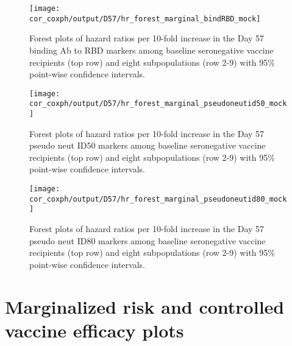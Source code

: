 \documentclass[]{book}
\theoremstyle{definition}
\theoremstyle{definition}
\theoremstyle{definition}
\newcommand{\1}{\mathbbm{1}}
\begin{document}
\begin{figure}[H]
    \centering
    \texttt{[image: cor\_coxph/output/D57/hr\_forest\_marginal\_bindRBD\_mock]}
    \caption{Forest plots of hazard ratios per 10-fold increase in the  Day 57 binding Ab to RBD markers among baseline seronegative vaccine recipients (top row) and eight subpopulations (row 2-9) with 95\% point-wise confidence intervals.}
\end{figure}
\begin{figure}[H]
    \centering
    \texttt{[image: cor\_coxph/output/D57/hr\_forest\_marginal\_pseudoneutid50\_mock]}
    \caption{Forest plots of hazard ratios per 10-fold increase in the  Day 57 pseudo neut ID50 markers among baseline seronegative vaccine recipients (top row) and eight subpopulations (row 2-9) with 95\% point-wise confidence intervals.}
\end{figure}

\begin{figure}[H]
    \centering
    \texttt{[image: cor\_coxph/output/D57/hr\_forest\_marginal\_pseudoneutid80\_mock]}
    \caption{Forest plots of hazard ratios per 10-fold increase in the  Day 57 pseudo neut ID80 markers among baseline seronegative vaccine recipients (top row) and eight subpopulations (row 2-9) with 95\% point-wise confidence intervals.}
\end{figure}
\clearpage

\hypertarget{marginalized-risk-and-controlled-vaccine-efficacy-plots}{%
\section{Marginalized risk and controlled vaccine efficacy plots}\label{marginalized-risk-and-controlled-vaccine-efficacy-plots}}
\end{document}

